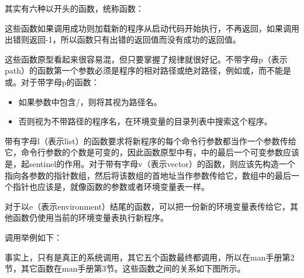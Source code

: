 其实有六种以开头的函数，统称函数：




这些函数如果调用成功则加载新的程序从启动代码开始执行，不再返回，如果调用出错则返回-1，所以函数只有出错的返回值而没有成功的返回值。



这些函数原型看起来很容易混，但只要掌握了规律就很好记。不带字母p（表示path）的函数第一个参数必须是程序的相对路径或绝对路径，例如或，而不能是或。对于带字母p的函数：


\begin{itemize}

\item 如果参数中包含/，则将其视为路径名。

\item 否则视为不带路径的程序名，在环境变量的目录列表中搜索这个程序。
\end{itemize}


带有字母l（表示list）的函数要求将新程序的每个命令行参数都当作一个参数传给它，命令行参数的个数是可变的，因此函数原型中有，中的最后一个可变参数应该是，起sentinel的作用。对于带有字母v（表示vector）的函数，则应该先构造一个指向各参数的指针数组，然后将该数组的首地址当作参数传给它，数组中的最后一个指针也应该是，就像函数的参数或者环境变量表一样。



对于以e（表示environment）结尾的函数，可以把一份新的环境变量表传给它，其他函数仍使用当前的环境变量表执行新程序。



调用举例如下：




事实上，只有是真正的系统调用，其它五个函数最终都调用，所以在man手册第2节，其它函数在man手册第3节。这些函数之间的关系如下图所示。




